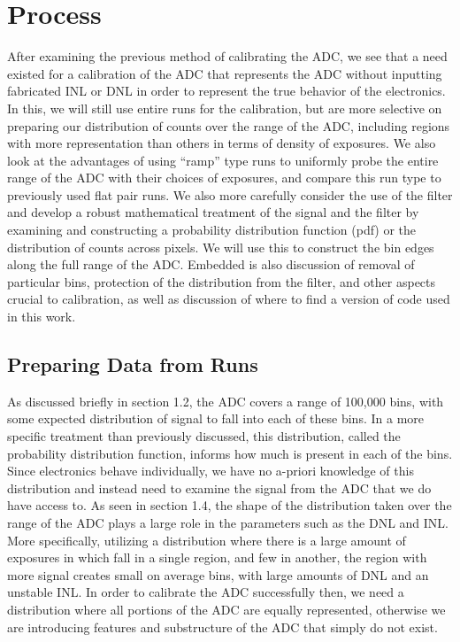 \documentclass[11pt, letterpaper]{article}
\begin{document}
\section{Process}
\indent


After examining the previous method of calibrating the ADC, we see that a need existed for a calibration of the ADC that represents the ADC without inputting fabricated INL or DNL in order to represent the true behavior of the electronics. 
In this, we will still use entire runs for the calibration, but are more selective on preparing our distribution of counts over the range of the ADC, including regions with more representation than others in terms of density of exposures. 
We also look at the advantages of using “ramp” type runs to uniformly probe the entire range of the ADC with their choices of exposures, and compare this run type to previously used flat pair runs.
We also more carefully consider the use of the filter and develop a robust mathematical treatment of the signal and the filter by examining and constructing a probability distribution function (pdf) or the distribution of counts across pixels.  
We will use this to construct the bin edges along the full range of the ADC. 
Embedded is also discussion of removal of particular bins, protection of the distribution from the filter, and other aspects crucial to calibration, as well as discussion of where to find a version of code used in this work.

\subsection{Preparing Data from Runs}
\indent


As discussed briefly in section 1.2, the ADC covers a range of 100,000 bins, with some expected distribution of signal to fall into each of these bins. 
In a more specific treatment than previously discussed, this distribution, called the probability distribution function, informs how much is present in each of the bins. 
Since electronics behave individually, we have no a-priori knowledge of this distribution and instead need to examine the signal from the ADC that we do have access to. 
As seen in section 1.4, the shape of the distribution taken over the range of the ADC plays a large role in the parameters such as the DNL and INL.
More specifically, utilizing a distribution where there is a large amount of exposures in which fall in a single region, and few in another, the region with more signal creates small on average bins, with large amounts of DNL and an unstable INL. 
In order to calibrate the ADC successfully then, we need a distribution where all portions of the ADC are equally represented, otherwise we are introducing features and substructure of the ADC that simply do not exist. 
\indent 
\end{document}
